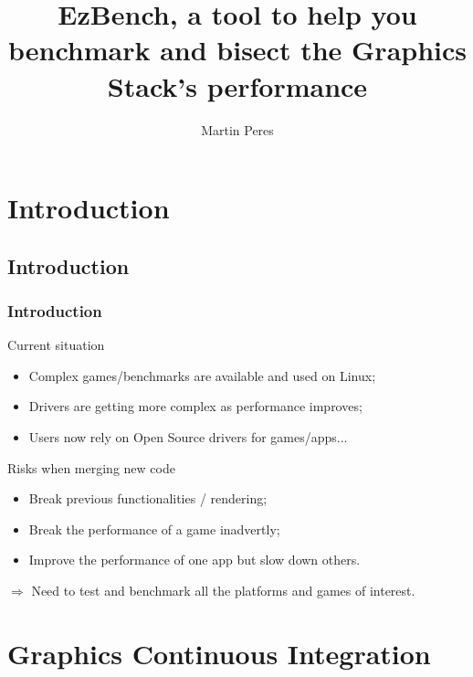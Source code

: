 \documentclass[11pt,english,compress]{beamer}
\title{EzBench, a tool to help you benchmark and bisect the Graphics Stack's performance}
\subtitle{}
\author{Martin Peres}
\institute{Intel Open Source Technology Center Finland}
\begin{document}

\begin{frame}
	\titlepage
\end{frame}

\section{Introduction}
\subsection*{Introduction}
\begin{frame}
	\frametitle{Introduction}

	\begin{block}{Current situation}
		\begin{itemize}
			\item Complex games/benchmarks are available and used on Linux;
			\item Drivers are getting more complex as performance improves;
			\item Users now rely on Open Source drivers for games/apps...
		\end{itemize}
	\end{block}
	
	\pause
	
	\begin{block}{Risks when merging new code}
		\begin{itemize}
			\item Break previous functionalities / rendering;
			\item Break the performance of a game inadvertly;
			\item Improve the performance of one app but slow down others.
		\end{itemize}
	\end{block}
	
	\pause
	
	\begin{block}{}
		$\Rightarrow$ Need to test and benchmark all the platforms and games of interest.
	\end{block}
\end{frame}

\section{Graphics Continuous Integration}
\end{document}
